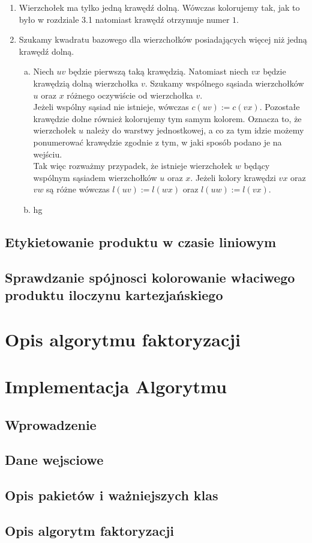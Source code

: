 \documentclass[12pt,a4paper,titlepage]{article}
\begin{document}
\begin{enumerate}
\item Wierzchołek ma tylko jedną krawędź dolną. Wówczas kolorujemy tak, jak to było w rozdziale 3.1 natomiast krawędź otrzymuje numer $1$. 
\item Szukamy kwadratu bazowego dla wierzchołków posiadających więcej niż jedną krawędź dolną. 
\begin{enumerate}[a)]
\item
Niech $uv$ będzie pierwszą taką krawędzią. Natomiast niech $vx$ będzie krawędzią dolną wierzchołka $v$. Szukamy wspólnego sąsiada wierzchołków $u$ oraz $x$ różnego oczywiście od wierzchołka $v$. \\
Jeżeli wspólny sąsiad nie istnieje, wówczas $c(uv):=c(vx)$. Pozostałe krawędzie dolne również kolorujemy tym samym kolorem. Oznacza to, że wierzchołek $u$ należy do warstwy jednostkowej, a co za tym idzie możemy ponumerować krawędzie zgodnie z tym, w jaki sposób podano je na wejściu.\\
Tak więc rozważmy przypadek, że istnieje wierzchołek $w$ będący wspólnym sąsiadem wierzchołków $u$ oraz $x$. Jeżeli kolory krawędzi $vx$ oraz $vw$ są różne wówczas $l(uv):=l(wx)$ oraz $l(uw):=l(vx)$.
\item hg
\end{enumerate}
\end{enumerate}

\subsection{Etykietowanie produktu w czasie liniowym}
\subsection{Sprawdzanie spójnosci kolorowanie właciwego produktu iloczynu kartezjańskiego}
\section{Opis algorytmu faktoryzacji}
\section{Implementacja Algorytmu}
\subsection{Wprowadzenie}
\subsection{Dane wejsciowe}
\subsection{Opis pakietów i ważniejszych klas}
\subsection{Opis algorytm faktoryzacji}
\end{document}
